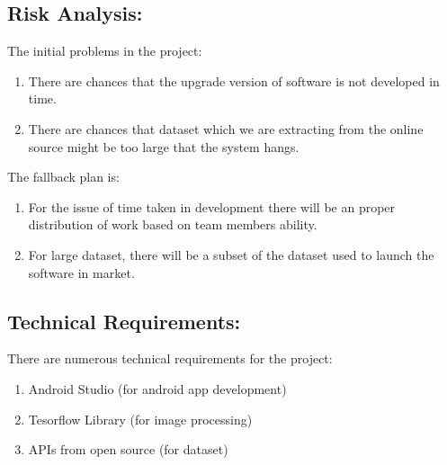 \documentclass[18 pt]{article}
\begin{document}
\begin{large}
\begin{enumerate}
\end{enumerate}


\subsection*{Risk Analysis:}
The initial problems in the project:
\begin{enumerate}
\item	There are chances that the upgrade version of software is not developed in time.
\item	There are chances that dataset which we are extracting from the online source might be too large that the system hangs.

\end{enumerate}
The fallback plan is:
\begin{enumerate}
\item	For the issue of time taken in development there will be an proper distribution of work based on team members ability.
\item	For large dataset, there will be a subset of the dataset used to launch the software in market.
\end{enumerate}

\subsection*{Technical Requirements:}
There are numerous technical requirements for the project:
\begin{enumerate}
\item	Android Studio (for android app development)
\item	Tesorflow Library (for image processing)
\item	APIs from open source (for dataset)
\end{enumerate}




\end{large}
\end{document}
